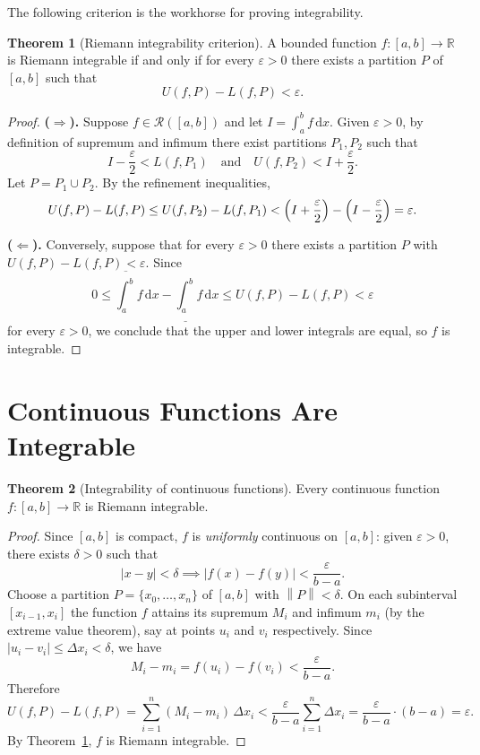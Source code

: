 \documentclass[12pt,a4paper]{book}
\theoremstyle{definition}
\newtheorem{theorem}{Theorem}[chapter]
\newcommand{\R}{\mathbb{R}}
\newcommand{\eps}{\varepsilon}
\newcommand{\abs}[1]{\left\lvert #1 \right\rvert}
\newcommand{\norm}[1]{\left\lVert #1 \right\rVert}
\newcommand{\dd}{\,\mathrm{d}}
\begin{document}
The following criterion is the workhorse for proving integrability.

\begin{theorem}[Riemann integrability criterion]\label{thm:int-criterion}
  A bounded function $f\colon[a,b]\to\R$ is Riemann integrable if and
  only if for every $\eps>0$ there exists a partition $P$ of $[a,b]$ such
  that
  \[
    U(f,P) - L(f,P) < \eps.
  \]
\end{theorem}

\begin{proof}
  \textbf{($\Rightarrow$).}\;
  Suppose $f\in\mathcal{R}([a,b])$ and let $I=\int_a^b f\dd x$.
  Given $\eps>0$, by definition of supremum and infimum there exist
  partitions $P_1,P_2$ such that
  \[
    I - \frac{\eps}{2} < L(f,P_1)
    \quad\text{and}\quad
    U(f,P_2) < I + \frac{\eps}{2}.
  \]
  Let $P=P_1\cup P_2$.  By the refinement inequalities,
  \[
    U(f,P) - L(f,P) \le U(f,P_2) - L(f,P_1)
    < \Bigl(I+\frac{\eps}{2}\Bigr) - \Bigl(I-\frac{\eps}{2}\Bigr) = \eps.
  \]

  \textbf{($\Leftarrow$).}\;
  Conversely, suppose that for every $\eps>0$ there exists a partition $P$
  with $U(f,P)-L(f,P)<\eps$.  Since
  \[
    0 \le \overline{\int_a^b}f\dd x - \underline{\int_a^b}f\dd x
    \le U(f,P) - L(f,P) < \eps
  \]
  for every $\eps>0$, we conclude that the upper and lower integrals are
  equal, so $f$ is integrable.
\end{proof}


\section{Continuous Functions Are Integrable}\label{sec:cont-integrable}

\begin{theorem}[Integrability of continuous functions]\label{thm:cont-integrable}
  Every continuous function $f\colon[a,b]\to\R$ is Riemann integrable.
\end{theorem}

\begin{proof}
  Since $[a,b]$ is compact, $f$ is \emph{uniformly} continuous on
  $[a,b]$: given $\eps>0$, there exists $\delta>0$ such that
  \[
    \abs{x-y}<\delta \implies \abs{f(x)-f(y)}<\frac{\eps}{b-a}.
  \]
  Choose a partition $P=\{x_0,\ldots,x_n\}$ of $[a,b]$ with
  $\norm{P}<\delta$.  On each subinterval $[x_{i-1},x_i]$ the function
  $f$ attains its supremum $M_i$ and infimum $m_i$ (by the extreme
  value theorem), say at points $u_i$ and $v_i$ respectively.  Since
  $\abs{u_i-v_i}\le\Delta x_i<\delta$, we have
  \[
    M_i - m_i = f(u_i)-f(v_i) < \frac{\eps}{b-a}.
  \]
  Therefore
  \[
    U(f,P) - L(f,P)
    = \sum_{i=1}^n (M_i-m_i)\,\Delta x_i
    < \frac{\eps}{b-a}\sum_{i=1}^n \Delta x_i
    = \frac{\eps}{b-a}\cdot(b-a) = \eps.
  \]
  By Theorem~\ref{thm:int-criterion}, $f$ is Riemann integrable.
\end{proof}
\end{document}

